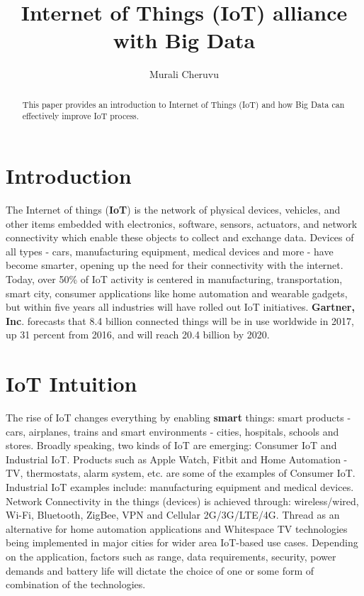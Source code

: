 \documentclass[sigconf]{acmart}
\begin{document}
\title{Internet of Things (IoT) alliance with Big Data}


\author{Murali Cheruvu}

\renewcommand{\shortauthors}{M. Cheruvu}


\begin{abstract}
This paper provides an introduction to Internet of Things (IoT) and how Big Data can effectively improve IoT process.
\end{abstract}



\maketitle

\section{Introduction}

The Internet of things (\textbf{IoT}) is the network of physical devices, vehicles, and other items embedded with electronics, software, sensors, actuators, and network connectivity which enable these objects to collect and exchange data. Devices of all types - cars, manufacturing equipment, medical devices and more - have become smarter, opening up the need for their connectivity with the internet. Today, over 50\% of IoT activity is centered in manufacturing, transportation, smart city, consumer applications like home automation and wearable gadgets, but within five years all industries will have rolled out IoT initiatives. \textbf{Gartner, Inc}. forecasts that 8.4 billion connected things will be in use worldwide in 2017, up 31 percent from 2016, and will reach 20.4 billion by 2020. 

\section{IoT Intuition}

The rise of IoT changes everything by enabling \textbf{smart} things: smart products - cars, airplanes, trains and smart environments - cities, hospitals, schools and stores. Broadly speaking, two kinds of IoT are emerging: Consumer IoT and Industrial IoT. Products such as Apple Watch, Fitbit and Home Automation - TV, thermostats, alarm system, etc. are some of the examples of Consumer IoT. Industrial IoT examples include: manufacturing equipment and medical devices. Network Connectivity in the things (devices) is achieved through: wireless/wired, Wi-Fi, Bluetooth, ZigBee, VPN and Cellular 2G/3G/LTE/4G. Thread as an alternative for home automation applications and Whitespace TV technologies being implemented in major cities for wider area IoT-based use cases. Depending on the application, factors such as range, data requirements, security, power demands and battery life will dictate the choice of one or some form of combination of the technologies.
\end{document}
